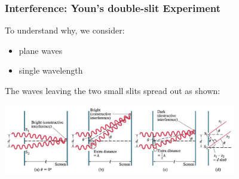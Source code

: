 \documentclass[]{beamer}
\begin{document}


\begin{frame}

\frametitle{Interference: Youn's double-slit Experiment}


To understand why, we consider:
\vspace{3mm}
\pause

\begin{itemize}
\item plane waves
\pause
\item single wavelength 
\end{itemize}

\pause

\vspace{3mm}

The waves leaving the two small slits spread out as shown:
\pause

\vspace{3mm}

  \begin{center}
  \includegraphics[height=1.2in]{images5/doubleslit2.jpg}
\end{center}


  \end{frame}




\end{document}
